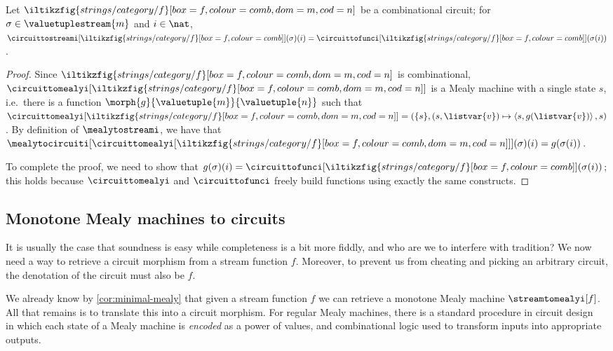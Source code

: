 \begin{lemma}\label{lem:sequential-combinational-semantics}
    Let \(\iltikzfig{strings/category/f}[box=f,colour=comb,dom=m,cod=n]\) be
    a combinational circuit; for \(\sigma \in \valuetuplestream{m}\) and
    \(i \in \nat\), \(
    \circuittostreami[\iltikzfig{strings/category/f}[box=f,colour=comb]](\sigma)(i)
    =
    \circuittofunci[\iltikzfig{strings/category/f}[box=f,colour=comb]](\sigma(i))
    \).
\end{lemma}
\begin{proof}
    Since \(\iltikzfig{strings/category/f}[box=f,colour=comb,dom=m,cod=n]\) is
    combinational, \(
    \circuittomealyi[
        \iltikzfig{strings/category/f}[box=f,colour=comb,dom=m,cod=n]
    ]
    \) is a Mealy machine with a single state \(s\), i.e.\ there is a function
    \(\morph{g}{\valuetuple{m}}{\valuetuple{n}}\) such that  \(
    \circuittomealyi[
        \iltikzfig{strings/category/f}[box=f,colour=comb,dom=m,cod=n]
    ] = (
    \{s\},
    (s, \listvar{v}) \mapsto \left\langle{s, g(\listvar{v})}\right\rangle,
    s
    )\).
    By definition of \(\mealytostreami\), we have that \(\mealytocircuiti[
        \circuittomealyi[
            \iltikzfig{strings/category/f}[box=f,colour=comb,dom=m,cod=n]
        ]
    ](\sigma)(i) = g(\sigma(i))\).

    To complete the proof, we need to show that \(
    g(\sigma)(i) =
    \circuittofunci[\iltikzfig{strings/category/f}[box=f,colour=comb]](\sigma(i))
    \); this holds because \(\circuittomealyi\) and \(\circuittofunci\) freely
    build functions using exactly the same constructs.
\end{proof}

\subsection{Monotone Mealy machines to circuits}

It is usually the case that soundness is easy while completeness is a bit more
fiddly, and who are we to interfere with tradition?
We now need a way to retrieve a circuit morphism from a stream
function \(f\).
Moreover, to prevent us from cheating and picking an arbitrary circuit, the
denotation of the circuit must also be \(f\).

We already know by \cref{cor:minimal-mealy} that given a stream function
\(f\) we can retrieve a monotone Mealy machine \(\streamtomealyi[f]\).
All that remains is to translate this into a circuit morphism.
For regular Mealy machines, there is a standard procedure in circuit
design~\cite{kohavi2009switching} in which each state of a Mealy machine is
\emph{encoded} as a power of values, and combinational logic used to transform
inputs into appropriate outputs.

